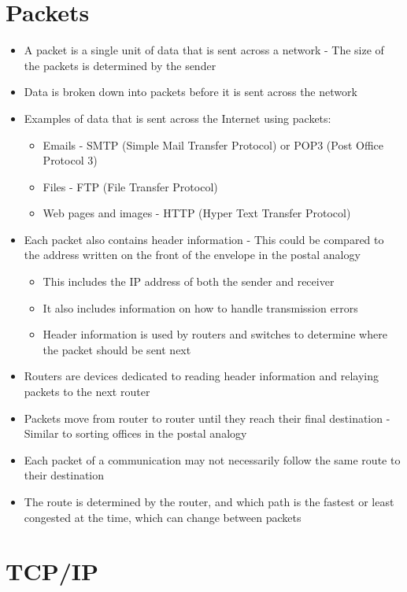 \section*{Packets}

\begin{itemize}
  \item A packet is a single unit of data that is sent across a network - The size of the packets is determined by the sender
  \item Data is broken down into packets before it is sent across the network
  \item Examples of data that is sent across the Internet using packets:
  \begin{itemize}
    \item Emails - SMTP (Simple Mail Transfer Protocol) or POP3 (Post Office Protocol 3)
    \item Files - FTP (File Transfer Protocol)
    \item Web pages and images - HTTP (Hyper Text Transfer Protocol)
  \end{itemize}
  \item Each packet also contains header information - This could be compared to the address written on the front of the envelope in the postal analogy
  \begin{itemize}
    \item This includes the IP address of both the sender and receiver
    \item It also includes information on how to handle transmission errors
    \item Header information is used by routers and switches to determine where the packet should be sent next
  \end{itemize}
  \item Routers are devices dedicated to reading header information and relaying packets to the next router
  \item Packets move from router to router until they reach their final destination - Similar to sorting offices in the postal analogy
  \item Each packet of a communication may not necessarily follow the same route to their destination
  \item The route is determined by the router, and which path is the fastest or least congested at the time, which can change between packets
\end{itemize}

\section*{TCP/IP}

